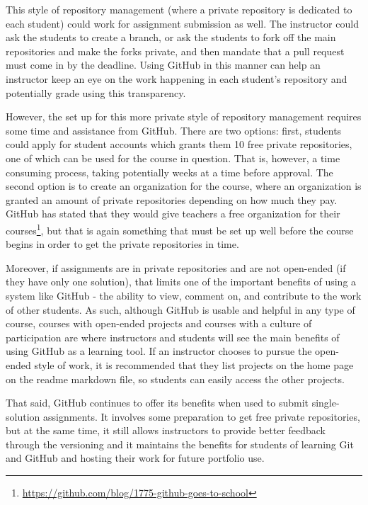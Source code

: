 This style of repository management (where a private repository is dedicated to each student) could work for assignment submission as well. The instructor could ask the students to create a branch, or ask the students to fork off the main repositories and make the forks private, and then mandate that a pull request must come in by the deadline. Using GitHub in this manner can help an instructor keep an eye on the work happening in each student's repository and potentially grade using this transparency.

However, the set up for this more private style of repository management requires some time and assistance from GitHub. There are two options: first, students could apply for student accounts which grants them 10 free private repositories, one of which can be used for the course in question. That is, however, a time consuming process, taking potentially weeks at a time before approval. The second option is to create an organization for the course, where an organization is granted an amount of private repositories depending on how much they pay. GitHub has stated that they would give teachers a free organization for their courses\footnote{\url{https://github.com/blog/1775-github-goes-to-school}}, but that is again something that must be set up well before the course begins in order to get the private repositories in time.

Moreover, if assignments are in private repositories and are not open-ended (if they have only one solution), that limits one of the important benefits of using a system like GitHub - the ability to view, comment on, and contribute to the work of other students. As such, although GitHub is usable and helpful in any type of course, courses with open-ended projects and courses with a culture of participation are where instructors and students will see the main benefits of using GitHub as a learning tool. If an instructor chooses to pursue the open-ended style of work, it is recommended that they list projects on the home page on the readme markdown file, so students can easily access the other projects.

That said, GitHub continues to offer its benefits when used to submit single-solution assignments. It involves some preparation to get free private repositories, but at the same time, it still allows instructors to provide better feedback through the versioning and it maintains the benefits for students of learning Git and GitHub and hosting their work for future portfolio use. \\

